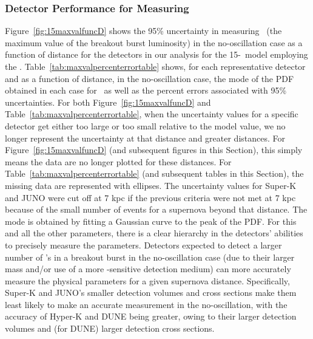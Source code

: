 \subsubsection{Detector Performance for Measuring \lmax}
Figure~\ref{fig:15maxvalfuncD} shows the 95\% uncertainty in
measuring \lmax\ (the maximum value of the breakout burst luminosity)
in the no-oscillation case as a function of distance for the detectors in our
analysis for the 15-\Msol\ model employing the \ls. 
Table~\ref{tab:maxvalpercenterrortable} shows, for each representative
detector and as a function of distance, in the no-oscillation case, 
the mode of the PDF obtained
in each case for \lmax\ as well as the percent
errors associated with 95\% uncertainties.  For both
Figure~\ref{fig:15maxvalfuncD} and
Table~\ref{tab:maxvalpercenterrortable},  when the uncertainty values for a
  specific detector get either
  too large or too small relative to the model value, we no longer
  represent 
  the uncertainty at that distance and greater distances.  For
  Figure~\ref{fig:15maxvalfuncD} (and subsequent figures in this
  Section), 
this simply means the data are no
  longer plotted for these distances.  For
  Table~\ref{tab:maxvalpercenterrortable} (and subsequent tables in
  this Section), the missing data are
  represented with ellipses.
The uncertainty values for 
Super-K and JUNO were cut off
  at 7 kpc if the previous criteria were not met at 7 kpc because of
  the small number of events for a supernova beyond that
  distance.
The mode is obtained
by fitting a Gaussian curve to the peak of the PDF.
 For this and all the other parameters, there is a clear
hierarchy in the detectors' abilities to precisely measure the
parameters.  Detectors expected to detect a larger number of \nue's in
a breakout burst in the no-oscillation case 
(due to their larger mass and/or use of a more
\nue-sensitive detection medium) can more accurately measure
the physical parameters for a given supernova distance.  
Specifically, Super-K
and JUNO's smaller detection volumes and cross sections make them least
likely to make an accurate measurement in the no-oscillation, with the accuracy of  
Hyper-K and DUNE being greater, owing to their larger detection
volumes and (for DUNE) larger detection cross sections. 

